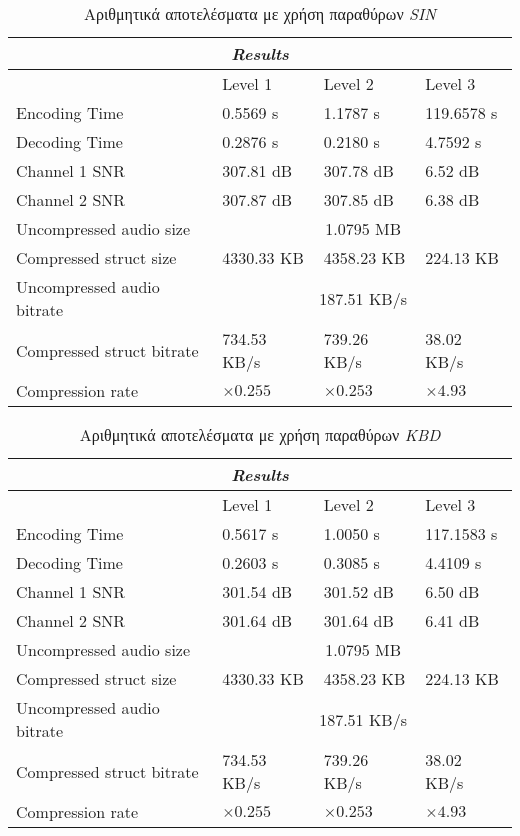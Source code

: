 \begin{table}
	\centering
	\begin{tabular}{l | l | l | l}
		\multicolumn{4}{c}{\emph{Results}} \\ \hline
		& Level 1 & Level 2 & Level 3 \\ \hline
		Encoding Time & 0.5569 s & 1.1787 s & 119.6578 s \\ \hline
		Decoding Time & 0.2876 s & 0.2180 s & 4.7592 s \\ \hline
		Channel 1 SNR & 307.81 dB & 307.78 dB & 6.52 dB \\ \hline
		Channel 2 SNR & 307.87 dB & 307.85 dB & 6.38 dB \\ \hline
		Uncompressed audio size & \multicolumn{3}{c}{1.0795 MB} \\ \hline
		Compressed struct size & 4330.33 KB & 4358.23 KB & 224.13 KB \\ \hline
		Uncompressed audio bitrate & \multicolumn{3}{c}{187.51 KB/s} \\ \hline
		Compressed struct bitrate & 734.53 KB/s & 739.26 KB/s & 38.02 KB/s \\ \hline
		Compression rate & $\times 0.255$ & $\times 0.253$ & $\times 4.93$ \\
	\end{tabular}
	\caption{Αριθμητικά αποτελέσματα με χρήση παραθύρων \emph{SIN}}
	\label{tab:results_sin}
\end{table}

\begin{table}
	\centering
	\begin{tabular}{l | l | l | l}
		\multicolumn{4}{c}{\emph{Results}} \\ \hline
		& Level 1 & Level 2 & Level 3 \\ \hline
		Encoding Time & 0.5617 s & 1.0050 s & 117.1583 s \\ \hline
		Decoding Time & 0.2603 s & 0.3085 s & 4.4109 s \\ \hline
		Channel 1 SNR & 301.54 dB & 301.52 dB & 6.50 dB \\ \hline
		Channel 2 SNR & 301.64 dB & 301.64 dB & 6.41 dB \\ \hline
		Uncompressed audio size & \multicolumn{3}{c}{1.0795 MB} \\ \hline
		Compressed struct size & 4330.33 KB & 4358.23 KB & 224.13 KB \\ \hline
		Uncompressed audio bitrate & \multicolumn{3}{c}{187.51 KB/s} \\ \hline
		Compressed struct bitrate & 734.53 KB/s & 739.26 KB/s & 38.02 KB/s \\ \hline
		Compression rate & $\times 0.255$ & $\times 0.253$ & $\times 4.93$ \\
	\end{tabular}
	\caption{Αριθμητικά αποτελέσματα με χρήση παραθύρων \emph{KBD}}
	\label{tab:results_kbd}
\end{table}